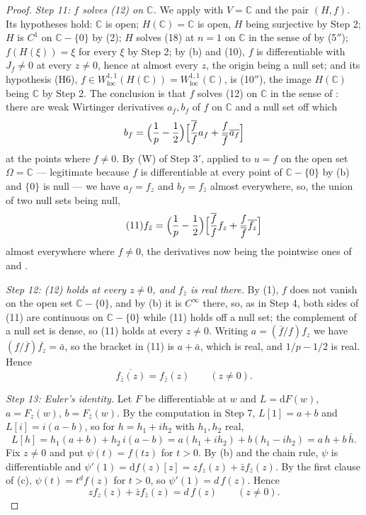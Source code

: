 \begin{proof}
\emph{Step 11: $f$ solves (12) on $\mathbb{C}$.}  We apply
 with $V=\mathbb{C}$ and the pair $(H,f)$.  Its
hypotheses hold: $\mathbb{C}$ is open; $H(\mathbb{C})=\mathbb{C}$ is open, $H$
being surjective by Step 2; $H$ is $C^1$ on $\mathbb{C}-\{0\}$ by (2); $H$
solves (18) at $n=1$ on $\mathbb{C}$ in the sense of  by
(5$''$); $f(H(\xi))=\xi$ for every $\xi$ by Step 2; by (b) and (10), $f$ is
differentiable with $J_f\neq0$ at every $z\neq0$, hence at almost every $z$,
the origin being a null set; and its hypothesis (H6),
$f\in W^{1,1}_{\mathrm{loc}}(H(\mathbb{C}))=W^{1,1}_{\mathrm{loc}}(\mathbb{C})$,
is (10$''$), the image $H(\mathbb{C})$ being $\mathbb{C}$ by Step 2.  The
conclusion is that $f$ solves (12) on $\mathbb{C}$ in the sense of
: there are weak Wirtinger derivatives $a_f,b_f$ of $f$ on
$\mathbb{C}$ and a null set off which
\[
  b_f=\Bigl(\frac1p-\frac12\Bigr)
    \Bigl[\frac{\overline{f}}{f}a_f+\frac{f}{\overline{f}}
      \overline{a_f}\Bigr]
\]
at the points where $f\neq0$.  By (W) of Step 3$'$, applied to $u=f$ on the open set
$\Omega=\mathbb{C}$ --- legitimate because $f$ is differentiable at every point
of $\mathbb{C}-\{0\}$ by (b) and $\{0\}$ is null --- we have $a_f=f_z$ and
$b_f=f_{\bar z}$ almost everywhere, so, the union of two null sets being null,
\begin{equation}\tag{11}
  f_{\bar z}=\Bigl(\frac1p-\frac12\Bigr)
    \Bigl[\frac{\overline{f}}{f}f_z+\frac{f}{\overline{f}}
      \overline{f_z}\Bigr]
\end{equation}
almost everywhere where $f\neq0$, the derivatives now being the pointwise ones
of  and .

\emph{Step 12: (12) holds at every $z\neq0$, and $f_{\bar z}$ is real there.}  By
(1), $f$ does not vanish on the open set $\mathbb{C}-\{0\}$, and by (b) it is
$C^\infty$ there, so, as in Step 4, both sides of (11) are continuous on
$\mathbb{C}-\{0\}$ while (11) holds off a null set; the complement of a null set
is dense, so (11) holds at every $z\neq0$.  Writing
$a=(\overline{f}/f)f_z$ we have $(f/\overline{f})\overline{f_z}=\bar a$, so the
bracket in (11) is $a+\bar a$, which is real, and $1/p-1/2$ is real.  Hence
\begin{equation}\tag{12}
  \overline{f_{\bar z}(z)}=f_{\bar z}(z)\qquad(z\neq0).
\end{equation}

\emph{Step 13: Euler's identity.}  Let $F$ be differentiable at $w$ and
$L=\mathrm{d}F(w)$, $a=F_z(w)$, $b=F_{\bar z}(w)$.  By the computation in
Step 7, $L[1]=a+b$ and $L[i]=i(a-b)$, so for $h=h_1+ih_2$ with $h_1,h_2$ real,
\[
  L[h]=h_1(a+b)+h_2\,i(a-b)=a(h_1+ih_2)+b(h_1-ih_2)=a\,h+b\,\bar h .
\]
Fix $z\neq0$ and put $\psi(t)=f(tz)$ for $t>0$.  By (b) and the chain rule,
$\psi$ is differentiable and $\psi'(1)=\mathrm{d}f(z)[z]=z f_z(z)+\bar z
f_{\bar z}(z)$.  By the first clause of (c), $\psi(t)=t^{d}f(z)$ for $t>0$, so
$\psi'(1)=d\,f(z)$.  Hence
\begin{equation}\tag{13}
  z f_z(z)+\bar z f_{\bar z}(z)=d\,f(z)\qquad(z\neq0).
\end{equation}


\end{proof}
